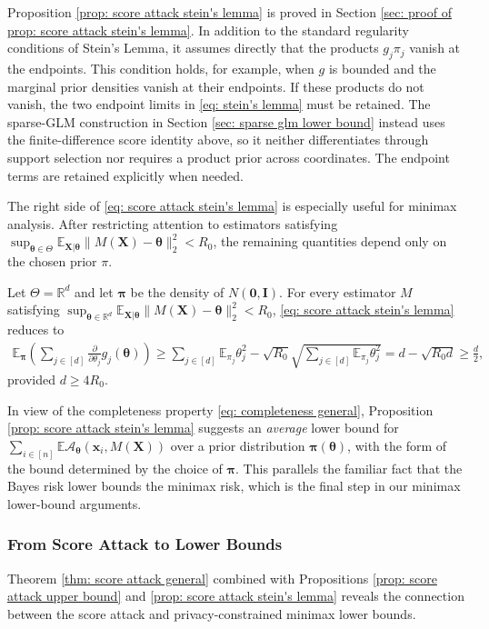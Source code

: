 \documentclass[letterpaper,12pt]{article}
\numberwithin{equation}{section}
\theoremstyle{plain}
\numberwithin{Theorem}{section}
\numberwithin{proposition}{section}
\numberwithin{Lemma}{section}
{
	\theoremstyle{definition}
	\newtheorem{Definition}{Definition}
	\newtheorem{example}{Example}
	\numberwithin{example}{section}
	\newtheorem{fact}{Fact}
	\numberwithin{fact}{section}
	\newtheorem{remark}{Remark}
}
\newcommand{\rev}[1]{#1}
\newcommand{\furtherrev}[1]{#1}
\newcommand{\A}{\mathcal{A}}
\newcommand{\1}{\mathbbm{1}}
\def\bth{{\boldsymbol{\theta}}}
\def\R{{\mathbb R}}
\def\E{\mathbb{E}}
\begin{document}
Proposition \ref{prop: score attack stein's lemma} is proved in Section \ref{sec: proof of prop: score attack stein's lemma}. In addition to the standard regularity conditions of Stein's Lemma, it assumes directly that the products $g_j\pi_j$ vanish at the endpoints. This condition holds, for example, when $g$ is bounded and the marginal prior densities vanish at their endpoints. If these products do not vanish, the two endpoint limits in \eqref{eq: stein's lemma} must be retained. \rev{The sparse-GLM construction in Section \ref{sec: sparse glm lower bound} instead uses the finite-difference score identity above, so it neither differentiates through support selection nor requires a product prior across coordinates.} The endpoint terms are retained explicitly when needed.


The right side of \eqref{eq: score attack stein's lemma} is especially useful
for minimax analysis.  After restricting attention to estimators satisfying
$\sup_{\bth \in \Theta}\E_{\bm X|\bth}
\|M(\bm X)-\bth\|_2^2<\furtherrev{R_0}$, the remaining quantities depend only on the chosen
prior $\pi$.
\begin{example}\label{ex: Gaussian stein's lemma}
		Let $\Theta=\R^d$ and let $\bm \pi$ be the density of $N(\bm 0, \bm I)$. For every estimator $M$ satisfying $\sup_{\bth \in \R^d}\E_{\bm X|\bth} \|M(\bm X) - \bth\|_2^2 < \furtherrev{R_0}$, \eqref{eq: score attack stein's lemma} reduces to
	\begin{align*}
			\E_{\bm \pi} \left(\sum_{j \in [d]} \frac{\partial}{\partial \theta_j} g_j(\bth)\right) \geq \sum_{j \in [d]} \E_{\pi_j} \theta_j^2 - \sqrt{\furtherrev{R_0}} \sqrt{\sum_{j \in [d]} \E_{\pi_j} \theta_j^2} = d - \sqrt{\furtherrev{R_0} d} \geq \frac d2,
		\end{align*}
		provided $d\geq\furtherrev{4R_0}$.
\end{example}

In view of the completeness property \eqref{eq: completeness general}, Proposition \ref{prop: score attack stein's lemma} suggests an \textit{average} lower bound for $\sum_{i \in [n]} \E \A_\bth (\bm x_i, M(\bm X))$ over a prior distribution $\bm \pi(\bth)$, with the form of the bound determined by the choice of $\bm \pi$. This parallels the familiar fact that the Bayes risk lower bounds the minimax risk, which is the final step in our minimax lower-bound arguments.


\subsubsection{From Score Attack to Lower Bounds}\label{sec: attack to lower bounds}
Theorem \ref{thm: score attack general} combined with Propositions \ref{prop: score attack upper bound} and \ref{prop: score attack stein's lemma} reveals the connection between the score attack and privacy-constrained minimax lower bounds.
\end{document}

